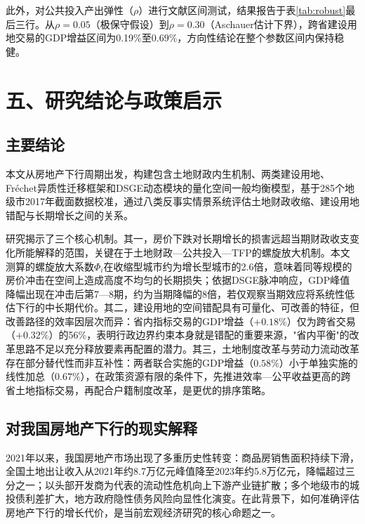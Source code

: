 \documentclass[UTF8,a4paper,12pt]{ctexart}
\theoremstyle{plain}
\theoremstyle{definition}
\theoremstyle{remark}
\begin{document}
此外，对公共投入产出弹性（$\rho$）进行文献区间测试，结果报告于表\ref{tab:robust}最后三行。从$\rho=0.05$（极保守假设）到$\rho=0.30$（Aschauer估计下界），跨省建设用地交易的GDP增益区间为0.19\%至0.69\%，方向性结论在整个参数区间内保持稳健。

\section{五、研究结论与政策启示}

\subsection{主要结论}

本文从房地产下行周期出发，构建包含土地财政内生机制、两类建设用地、Fréchet异质性迁移框架和DSGE动态模块的量化空间一般均衡模型，基于285个地级市2017年截面数据校准，通过八类反事实情景系统评估土地财政收缩、建设用地错配与长期增长之间的关系。

研究揭示了三个核心机制。其一，房价下跌对长期增长的损害远超当期财政收支变化所能解释的范围，关键在于土地财政—公共投入—TFP的螺旋放大机制。本文测算的螺旋放大系数$\Phi_i$在收缩型城市约为增长型城市的2.6倍，意味着同等规模的房价冲击在空间上造成高度不均匀的长期损失；依据DSGE脉冲响应，GDP峰值降幅出现在冲击后第7—8期，约为当期降幅的8倍，若仅观察当期效应将系统性低估下行的中长期代价。其二，建设用地的空间错配具有可量化、可改善的特征，但改善路径的效率因层次而异：省内指标交易的GDP增益（$+0.18\%$）仅为跨省交易（$+0.32\%$）的56\%，表明行政边界约束本身就是错配的重要来源，"省内平衡"的改革思路不足以充分释放要素再配置的潜力。其三，土地制度改革与劳动力流动改革存在部分替代性而非互补性：两者联合实施的GDP增益（$0.58\%$）小于单独实施的线性加总（$0.67\%$），在政策资源有限的条件下，先推进效率—公平收益更高的跨省土地指标交易，再配合户籍制度改革，是更优的排序策略。

\subsection{对我国房地产下行的现实解释}

2021年以来，我国房地产市场出现了多重历史性转变：商品房销售面积持续下滑，全国土地出让收入从2021年约8.7万亿元峰值降至2023年约5.8万亿元，降幅超过三分之一；以头部开发商为代表的流动性危机向上下游产业链扩散；多个地级市的城投债利差扩大，地方政府隐性债务风险向显性化演变。在此背景下，如何准确评估房地产下行的增长代价，是当前宏观经济研究的核心命题之一。
\end{document}
